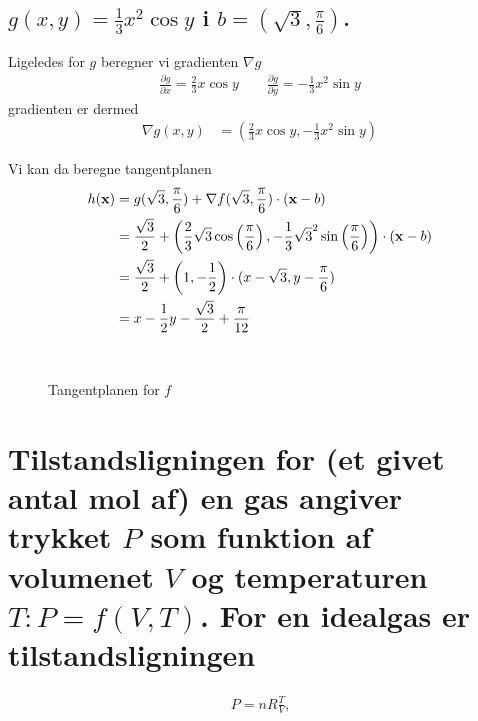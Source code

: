 \documentclass[11pt,a4paper]{article}
\newcommand{\colbreak}{\vfill{\ }\columnbreak}
\begin{document}
\subsection
{
    \mdseries $g(x,y) = \frac{1}{3} x^2 \cos y$ i $b = (\sqrt{3},\frac{\pi}{6})$.
}
\begin{multicols}{2}
    Ligeledes for $g$ beregner vi gradienten $\nabla g$
    \begin{align}
        \frac{\partial g}{\partial x} = \frac{2}{3}x \cos y
        \qquad
        \frac{\partial g}{\partial y} = -\frac{1}{3}x^2 \sin y
    \end{align}
    gradienten er dermed
    \begin{align}
        \nabla g(x,y) &= (\frac{2}{3}x \cos y, -\frac{1}{3}x^2 \sin y)
    \end{align}

    Vi kan da beregne tangentplanen
    \begin{align}
        h({\bf x}) &= g(\sqrt{3}, \frac{\pi}{6})
                    + \nabla f(\sqrt{3}, \frac{\pi}{6})
                      \cdot ({\bf x} - b) \\
                   &= \frac{\sqrt{3}}{2}
                    + \left(
                        \frac{2}{3} \sqrt{3}
                        \cos \left( \frac{\pi}{6} \right),
                        -\frac{1}{3} \sqrt{3}^2 \sin \left( \frac{\pi}{6} \right)
                      \right)
                      \cdot ({\bf x} - b) \\
                   &= \frac{\sqrt{3}}{2}
                    + \left( 1, -\frac{1}{2} \right)
                      \cdot (x - \sqrt{3}, y - \frac{\pi}{6}) \\
                      &= x - \frac{1}{2}y - \frac{\sqrt{3}}{2} + \frac{\pi}{12}
    \end{align}

    \colbreak

    \begin{figure}[H]
        \centering
        \caption{Tangentplanen for $f$}
        \label{fig:7-2a}
    \end{figure}

\end{multicols}

\section
{
    \mdseries
    Tilstandsligningen for (et givet antal mol af) en gas angiver trykket $P$
    som funktion af volumenet $V$ og temperaturen $T: P = f(V,T)$. For en
    idealgas er tilstandsligningen
}
\begin{align}
    P = n R \frac{T}{V}\text{,}
\end{align}
\end{document}

